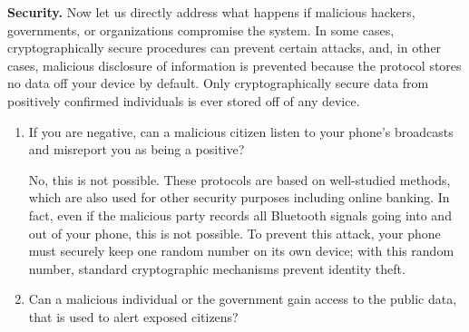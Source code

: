 \documentclass{article}
\begin{document}
\textbf{Security.} Now let us directly address what happens if malicious hackers, governments, or organizations compromise the system. In some cases, cryptographically secure procedures can prevent certain attacks, and, in other cases, malicious disclosure of information is prevented because the protocol stores no data off your device by default. Only cryptographically secure data from positively confirmed individuals is ever stored off of any device.

\begin{enumerate}[leftmargin=*]

\item If you are negative, can a malicious citizen listen to your phone's broadcasts and misreport you as being a positive?

   No, this is not possible. These protocols are based on well-studied methods, which are also used for other security purposes including online banking. In fact, even if the malicious party records all Bluetooth signals going into and out of your phone, this is not possible.   To prevent this attack, your phone must securely keep one random number on its own device; with this random number, standard cryptographic mechanisms prevent identity theft. 
   
   \iffalse 
   Again, recall that since you have not reported as being positive, then no information of yours will leave your phone\footnote{Technically, the Bluetooth protocol used is one where random signals are sent from your phone. However, these signals are random and reveal no information about any information on your phone, under standard  cryptographic assumptions.}.
   \fi
   
\iffalse
These protocols are based on well-studied methods, which are also used for other security purposes including online banking. In fact, even if the malicious party records all Bluetooth signals going into and out of your phone, this is not possible.  
To prevent this attack, your phone must securely keep one random number on its own device; with this random number, standard cryptographic mechanisms will prevent you from identity theft. 
\fi

\iffalse
\item Can a malicious individual or the government gain access to the public data, that is used to alert exposed citizens? 


\end{enumerate}
\end{document}
